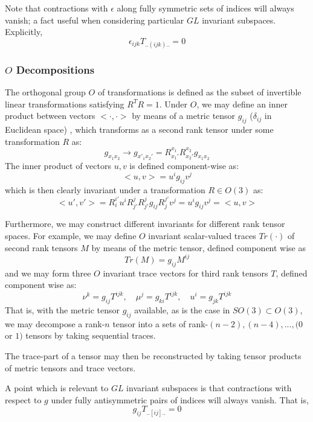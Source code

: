 \documentclass[10pt,a4paper]{article}
\begin{document}
Note that contractions with $\epsilon$ along fully symmetric sets of indices will always vanish; a fact useful when considering particular $GL$ invariant subspaces. Explicitly,
$$
\epsilon_{ijk}T_{..(ijk)..} = 0
$$

\subsubsection{$O$ Decompositions}
The orthogonal group $O$ of transformations is defined as the subset of invertible linear transformations satisfying $R^TR=1$. Under $O$, we may define an inner product between vectors $<\cdot , \cdot >$ by means of a metric tensor $g_{ij}$ ($\delta_{ij}$ in Euclidean space) , which transforms as a second rank tensor under some transformation $R$ as:
$$
g_{x_1x_2}\rightarrow g_{x'_1x_2'} = R_{x_1'}^{x_1} R_{x_2'}^{x_2}g_{x_1x_2}
$$
The inner product of vectors $u,v$ is defined component-wise as:
$$
<u,v> = u^i g_{ij}v^j
$$
which is then clearly invariant under a transformation $R\in O(3)$ as:
$$
<u',v'> = R_{i}^{i'}u^i R_{j'}^{j} R_{j'}^{j} g_{ij}R_{j}^{j'}v^j =u^i g_{ij}v^j =<u,v> 
$$
 
Furthermore, we may construct different invariants for different rank tensor spaces. For example, we may define $O$ invariant scalar-valued traces  $Tr(\cdot)$ of second rank tensors $M$ by means of the metric tensor, defined component wise as
$$
Tr(M) = g_{ij}M^{ij}
$$
and we may form three $O$ invariant trace vectors for third rank tensors $T$, defined component wise as:
$$
\nu^{k} = g_{ij}T^{ijk},\quad \mu^{j} = g_{ki}T^{ijk},\quad u^{i} = g_{jk}T^{ijk}
$$
That is, with the metric tensor $g_{ij}$ available, as is the case in $SO(3)\subset O(3)$, we may decompose a rank-$n$ tensor into a sets of rank-$(n-2),(n-4),...,(0$ or $1)$ tensors by taking sequential traces.


The trace-part of a tensor may then be reconstructed by taking tensor products of metric tensors and trace vectors.

A point which is relevant to $GL$ invariant subspaces is that contractions with respect to $g$ under fully antisymmetric pairs of indices will always vanish. That is,
$$
g_{ij}T_{..[ij]..} = 0
$$
\end{document}
